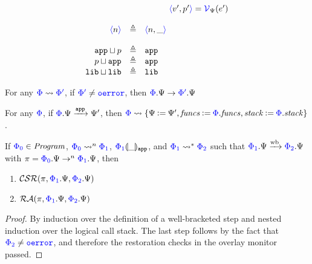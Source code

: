 \begin{center}
\[\begin{array}{rcl}
      & & \phantom{\text{where }} \val{v'}{p'} = \oimmval{\Psi}{e'} \\
      \\
      \natval{n} & \triangleq & \val{n}{\_} \\
      \\
      \trusted \sqcup p & \triangleq & \trusted \\
      p \sqcup \trusted & \triangleq & \trusted \\
      \untrusted \sqcup \untrusted & \triangleq & \untrusted \\
  \end{array}\]
  \label{fig:appendix:overlay:operational-aux-definitions}
\end{center}

\begin{lemma} \label{appendix:overlay:refinement}
  For any ${\color{blue}{\Phi}} \mathrel{\leadsto} {\color{blue}{\Phi'}}$, if ${\color{blue}{\Phi'}} \neq {\color{blue}{\mathtt{oerror}}}$, then ${\color{blue}{\Phi}}.\Psi \mathrel{\rightarrow} {\color{blue}{\Phi'}}.\Psi$
\end{lemma}

\begin{lemma} \label{appendix:overlay:application-equivalent}
  For any ${\color{blue}{\Phi}}$, if ${\color{blue}{\Phi}}.\Psi \mathrel{\xrightarrow{\mathtt{app}}} \Psi'$, then ${\color{blue}{\Phi}} \mathrel{\leadsto} \{\Psi \mathbin{\vcentcolon=} \Psi', \mathit{funcs} \mathbin{\vcentcolon=} {\color{blue}{\Phi}}.\mathit{funcs}, \mathit{stack} \mathbin{\vcentcolon=} {\color{blue}{\Phi}}.\mathit{stack}\}$.
\end{lemma}

\begin{theorem} \label{thm:appendix:overlay-integrity-soundness}
  If ${\color{blue}{\Phi_0}} \in \mathit{Program}$, ${\color{blue}{\Phi_0}} \mathrel{\mathrel{\leadsto}^{n}} {\color{blue}{\Phi_1}}$,
  ${{\color{blue}{\Phi_1}}}\llparenthesis{\_}\rrparenthesis_{\mathtt{app}}$, and
  ${\color{blue}{\Phi_1}} \mathrel{\mathrel{\leadsto}^{\ast}} {\color{blue}{\Phi_2}}$ such that ${\color{blue}{\Phi_1}}.\Psi \mathrel{\xrightarrow{\!\text{wb}}}
  {\color{blue}{\Phi_2}}.\Psi$ with $\pi = {\color{blue}{\Phi_0}}.\Psi \mathrel{\mathrel{\rightarrow}^{n}} {\color{blue}{\Phi_1}}.\Psi$, then
  \begin{enumerate}
  \item $\mathcal{CSR}(\pi, {\color{blue}{\Phi_1}}.\Psi, {\color{blue}{\Phi_2}}.\Psi)$
  \item $\mathcal{RA}(\pi, {\color{blue}{\Phi_1}}.\Psi, {\color{blue}{\Phi_2}}.\Psi)$
  \end{enumerate}
\end{theorem}
\begin{proof}
  By induction over the definition of a well-bracketed step and nested induction
  over the logical call stack.
  The last step follows by the fact that ${\color{blue}{\Phi_2}} \neq {\color{blue}{\mathtt{oerror}}}$, and
  therefore the restoration checks in the overlay monitor passed.
\end{proof}

